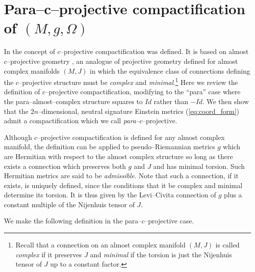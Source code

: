 



\chapter{Para--c--projective compactification of $(M,g,\Omega)$} \label{chap:c-proj}


In \cite{CG} the concept of $c$--projective compactification was
defined. It is based on almost $c$--projective geometry \cite{c_proj},
an analogue of projective geometry defined for almost complex
manifolds $(M,J)$ in which the equivalence class of connections
defining the $c$--projective structure must be \textit{complex} and
\textit{minimal}.\footnote{Recall that a connection on an almost
complex manifold $(M,J)$ is called \textit{complex} if it preserves $J$ and \textit{minimal} if the torsion is just the Nijenhuis tensor of $J$ up to a constant factor.} Here we review the definition of $c$--projective compactification, modifying to the ``para'' case where
the para--almost--complex structure squares to $Id$ rather than $-Id$. We then show that the $2n$--dimensional, neutral signature
Einstein metrics (\ref{eq:coord_form}) admit a compactification which we call \textit{para}--$c$--projective.

Although $c$--projective compactification is defined for any almost complex manifold, the definition can be applied to pseudo--Riemannian metrics $g$ which are Hermitian with respect to the almost complex structure so long as there exists a connection which preserves both $g$ and $J$ and has minimal torsion. Such Hermitian metrics are said to be \textit{admissible}.  Note that such a connection, if it exists, is uniquely defined, since the conditions that it be complex and minimal determine its torsion. It is thus given by the Levi--Civita connection of $g$ plus a constant multiple of the Nijenhuis tensor of $J$.

We make the following definition in the para--$c$--projective case.

